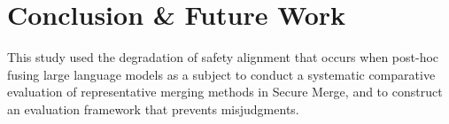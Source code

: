 \documentclass{article}
\begin{document}
\section{Conclusion \& Future Work}


This study used the degradation of safety alignment that occurs when post-hoc fusing large language models as a subject to conduct a systematic comparative evaluation of representative merging methods in Secure Merge, and to construct an evaluation framework that prevents misjudgments.

\end{document}
